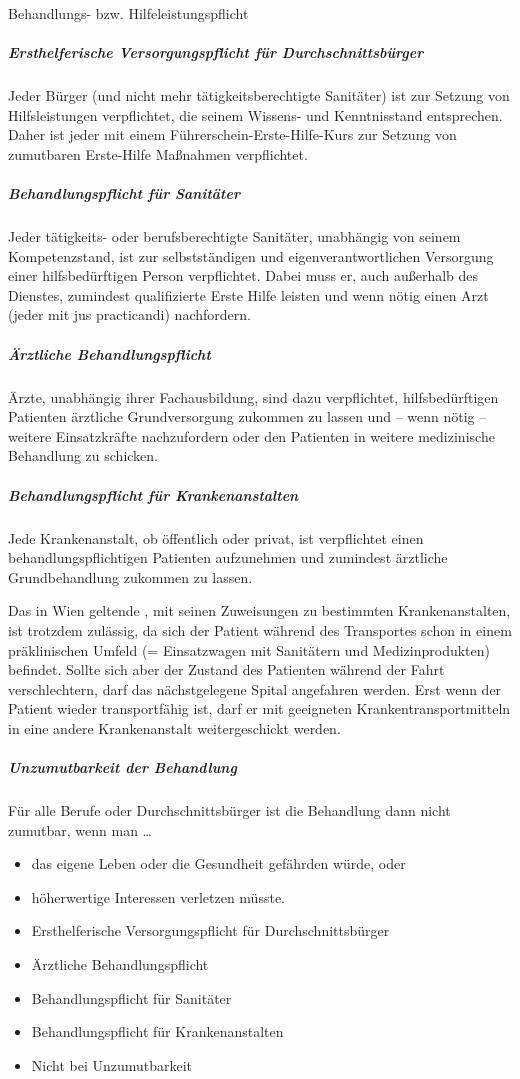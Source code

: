 {Behandlungs- bzw. Hilfeleistungspflicht}
{
\subparagraph{Ersthelferische Versorgungspflicht für
Durchschnittsbürger} Jeder Bürger (und nicht mehr
tätigkeitsberechtigte Sanitäter) ist zur Setzung von
Hilfsleistungen verpflichtet, die seinem Wissens- und
Kenntnisstand entsprechen. Daher ist jeder mit einem
Führerschein-Erste-Hilfe-Kurs zur Setzung von zumutbaren
Erste-Hilfe Maßnahmen verpflichtet.

\subparagraph{Behandlungspflicht für Sanitäter}
Jeder tätigkeits- oder berufsberechtigte Sanitäter,
unabhängig von seinem Kompetenzstand, ist zur
selbstständigen und eigenverantwortlichen Versorgung einer
hilfsbedürftigen Person verpflichtet. Dabei muss er, auch
außerhalb des Dienstes, zumindest qualifizierte Erste Hilfe
leisten und wenn nötig einen Arzt (jeder mit jus
practicandi) nachfordern.

\subparagraph{Ärztliche Behandlungspflicht}
Ärzte, unabhängig ihrer Fachausbildung, sind dazu
verpflichtet, hilfsbedürftigen Patienten ärztliche
Grundversorgung zukommen zu lassen und -- wenn nötig --
weitere Einsatzkräfte nachzufordern oder den Patienten in
weitere medizinische Behandlung zu
schicken.

\subparagraph{Behandlungspflicht für Krankenanstalten}
Jede Krankenanstalt, ob öffentlich oder privat, ist
verpflichtet einen behandlungspflichtigen Patienten 
aufzunehmen und zumindest ärztliche Grundbehandlung zukommen
zu lassen.

Das in Wien geltende , mit seinen
Zuweisungen zu bestimmten Krankenanstalten, ist trotzdem
zulässig, da sich der Patient während des Transportes schon
in einem präklinischen Umfeld (= Einsatzwagen mit Sanitätern
und Medizinprodukten) befindet. Sollte sich aber der Zustand
des Patienten während der Fahrt verschlechtern, darf das
nächstgelegene Spital angefahren werden.
Erst wenn der Patient wieder transportfähig ist, darf er mit
geeigneten Krankentransportmitteln in eine andere
Krankenanstalt weitergeschickt werden.

\subparagraph{Unzumutbarkeit der Behandlung}
Für alle Berufe oder Durchschnittsbürger ist die Behandlung
dann nicht zumutbar, wenn man \ldots
\begin{itemize}
  \item das eigene Leben oder die Gesundheit gefährden würde, oder
  \item höherwertige Interessen verletzen
  müsste.
\end{itemize}

}
{%
\begin{itemize}
  \item Ersthelferische Versorgungspflicht für
  Durchschnittsbürger
  \item Ärztliche Behandlungspflicht
  \item Behandlungspflicht für Sanitäter 
  \item Behandlungspflicht für Krankenanstalten
  \item Nicht bei Unzumutbarkeit
\end{itemize}}
{}
{}
{}

